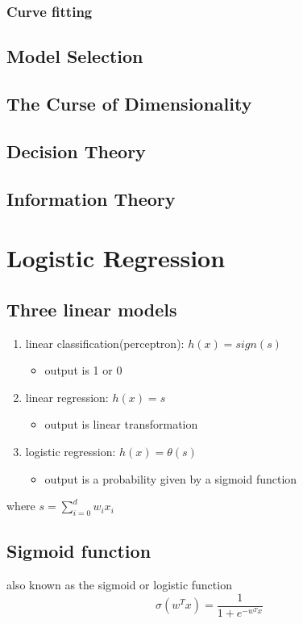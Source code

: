 \documentclass[11pt]{article}
\begin{document}
\subsubsection{Curve fitting}
\label{sec:orga93ac54}
\subsection{Model Selection}
\label{sec:orgd3331ca}
\subsection{The Curse of Dimensionality}
\label{sec:orgce96bc4}
\subsection{Decision Theory}
\label{sec:orgde215f4}
\subsection{Information Theory}
\label{sec:org6b67afd}
\section{Logistic Regression}
\label{sec:org6c28694}
\subsection{Three linear models}
\label{sec:org0e7fe1e}
\begin{enumerate}
\item linear classification(perceptron): \(h(x)=sign(s)\) 
\begin{itemize}
\item output is 1 or 0
\end{itemize}
\item linear regression: \(h(x)=s\) 
\begin{itemize}
\item output is linear transformation
\end{itemize}
\item logistic regression: \(h(x)= \theta(s)\)
\begin{itemize}
\item output is a probability given by a sigmoid function
\end{itemize}
\end{enumerate}
where \(s=\sum_{i=0}^{d}w_{i}x_{i}\) 

\subsection{Sigmoid function}
\label{sec:orgba3fd42}
also known as the sigmoid or logistic function 
$$
\sigma(w^Tx) = \frac{1}{1+e^{-w^T x}} 
$$
\end{document}
